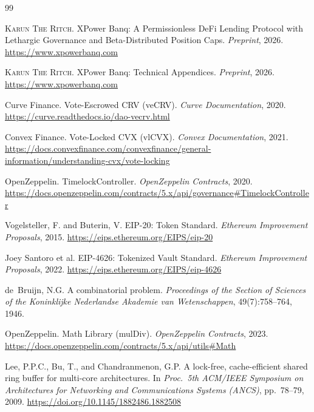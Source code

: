 \documentclass[10pt,a4paper,twocolumn]{article}
\theoremstyle{definition}
\theoremstyle{plain}
\theoremstyle{remark}
\begin{document}
\begin{thebibliography}{99}

\textsc{Karun The Ritch}.
\newblock XPower Banq: A Permissionless DeFi Lending Protocol with Lethargic Governance and Beta-Distributed Position Caps.
\newblock \emph{Preprint}, 2026.
\newblock \url{https://www.xpowerbanq.com}

\textsc{Karun The Ritch}.
\newblock XPower Banq: Technical Appendices.
\newblock \emph{Preprint}, 2026.
\newblock \url{https://www.xpowerbanq.com}

Curve Finance.
\newblock Vote-Escrowed CRV (veCRV).
\newblock \emph{Curve Documentation}, 2020.
\newblock \url{https://curve.readthedocs.io/dao-vecrv.html}

Convex Finance.
\newblock Vote-Locked CVX (vlCVX).
\newblock \emph{Convex Documentation}, 2021.
\newblock \url{https://docs.convexfinance.com/convexfinance/general-information/understanding-cvx/vote-locking}

OpenZeppelin.
\newblock TimelockController.
\newblock \emph{OpenZeppelin Contracts}, 2020.
\newblock \url{https://docs.openzeppelin.com/contracts/5.x/api/governance#TimelockController}

Vogelsteller, F. and Buterin, V.
\newblock EIP-20: Token Standard.
\newblock \emph{Ethereum Improvement Proposals}, 2015.
\newblock \url{https://eips.ethereum.org/EIPS/eip-20}

Joey Santoro et al.
\newblock EIP-4626: Tokenized Vault Standard.
\newblock \emph{Ethereum Improvement Proposals}, 2022.
\newblock \url{https://eips.ethereum.org/EIPS/eip-4626}

de~Bruijn, N.G.
\newblock A combinatorial problem.
\newblock \emph{Proceedings of the Section of Sciences of the Koninklijke Nederlandse Akademie van Wetenschappen}, 49(7):758--764, 1946.

OpenZeppelin.
\newblock Math Library (mulDiv).
\newblock \emph{OpenZeppelin Contracts}, 2023.
\newblock \url{https://docs.openzeppelin.com/contracts/5.x/api/utils#Math}

Lee, P.P.C., Bu, T., and Chandranmenon, G.P.
\newblock A lock-free, cache-efficient shared ring buffer for multi-core architectures.
\newblock In \emph{Proc.\ 5th ACM/IEEE Symposium on Architectures for Networking and Communications Systems (ANCS)}, pp.\ 78--79, 2009.
\newblock \url{https://doi.org/10.1145/1882486.1882508}

\end{thebibliography}
\end{document}

